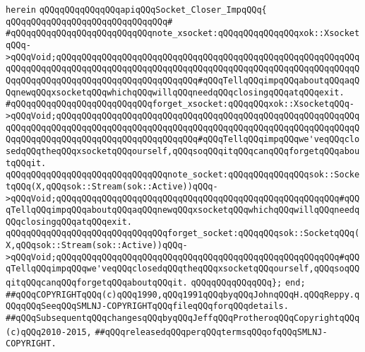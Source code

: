 \verb|herein|\newline
\newline
\verb|qQQqqQQqqQQqqQQqapiqQQqSocket_Closer_ImpqQQq{|\newline
\verb|qQQqqQQqqQQqqQQqqQQqqQQqqQQqqQQq#|\newline
\verb|#qQQqqQQqqQQqqQQqqQQqqQQqqQQqnote_xsocket:qQQqqQQqqQQqqQQqxok::XsocketqQQq->qQQqVoid;qQQqqQQqqQQqqQQqqQQqqQQqqQQqqQQqqQQqqQQqqQQqqQQqqQQqqQQqqQQqqQQqqQQqqQQqqQQqqQQqqQQqqQQqqQQqqQQqqQQqqQQqqQQqqQQqqQQqqQQqqQQqqQQqqQQqqQQqqQQqqQQqqQQqqQQqqQQqqQQqqQQqqQQq#qQQqTellqQQqimpqQQqaboutqQQqaqQQqnewqQQqxsocketqQQqwhichqQQqwillqQQqneedqQQqclosingqQQqatqQQqexit.|\newline
\verb|#qQQqqQQqqQQqqQQqqQQqqQQqqQQqforget_xsocket:qQQqqQQqxok::XsocketqQQq->qQQqVoid;qQQqqQQqqQQqqQQqqQQqqQQqqQQqqQQqqQQqqQQqqQQqqQQqqQQqqQQqqQQqqQQqqQQqqQQqqQQqqQQqqQQqqQQqqQQqqQQqqQQqqQQqqQQqqQQqqQQqqQQqqQQqqQQqqQQqqQQqqQQqqQQqqQQqqQQqqQQqqQQqqQQqqQQq#qQQqTellqQQqimpqQQqwe'veqQQqclosedqQQqtheqQQqxsocketqQQqourself,qQQqsoqQQqitqQQqcanqQQqforgetqQQqaboutqQQqit.|\newline
\newline
\verb|qQQqqQQqqQQqqQQqqQQqqQQqqQQqqQQqnote_socket:qQQqqQQqqQQqqQQqsok::SocketqQQq(X,qQQqsok::Stream(sok::Active))qQQq->qQQqVoid;qQQqqQQqqQQqqQQqqQQqqQQqqQQqqQQqqQQqqQQqqQQqqQQqqQQqqQQq#qQQqTellqQQqimpqQQqaboutqQQqaqQQqnewqQQqxsocketqQQqwhichqQQqwillqQQqneedqQQqclosingqQQqatqQQqexit.|\newline
\verb|qQQqqQQqqQQqqQQqqQQqqQQqqQQqqQQqforget_socket:qQQqqQQqsok::SocketqQQq(X,qQQqsok::Stream(sok::Active))qQQq->qQQqVoid;qQQqqQQqqQQqqQQqqQQqqQQqqQQqqQQqqQQqqQQqqQQqqQQqqQQqqQQq#qQQqTellqQQqimpqQQqwe'veqQQqclosedqQQqtheqQQqxsocketqQQqourself,qQQqsoqQQqitqQQqcanqQQqforgetqQQqaboutqQQqit.|\newline
\newline
\newline
\verb|qQQqqQQqqQQqqQQq};|\newline
\newline
\verb|end;|\newline
\newline
\verb|##qQQqCOPYRIGHTqQQq(c)qQQq1990,qQQq1991qQQqbyqQQqJohnqQQqH.qQQqReppy.qQQqqQQqSeeqQQqSMLNJ-COPYRIGHTqQQqfileqQQqforqQQqdetails.|\newline
\verb|##qQQqSubsequentqQQqchangesqQQqbyqQQqJeffqQQqProtheroqQQqCopyrightqQQq(c)qQQq2010-2015,|\newline
\verb|##qQQqreleasedqQQqperqQQqtermsqQQqofqQQqSMLNJ-COPYRIGHT.|\newline

